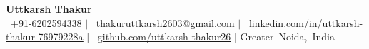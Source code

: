 \begin{center}
    \textbf{\Huge Uttkarsh Thakur} \\ \vspace{4pt}
    \small
    \mbox{\faPhone* \hspace{2pt} +91-6202594338} \hspace{1pt} $|$
    \hspace{1pt} \mbox{\faEnvelope \hspace{2pt} \href{mailto:thakuruttkarsh2603@gmail.com}{thakuruttkarsh2603@gmail.com}} \hspace{1pt} $|$
    \hspace{1pt} \mbox{\faLinkedin \hspace{2pt} \href{https://www.linkedin.com/in/uttkarsh-thakur-76979228a/}{\uline{linkedin.com/in/uttkarsh-thakur-76979228a}}} \hspace{1pt} $|$
    \hspace{1pt} \mbox{\faGithub \hspace{2pt} \href{https://github.com/uttkarsh-thakur26/}{\uline{github.com/uttkarsh-thakur26}}} \hspace{1pt} $|$
    \hspace{1pt} \mbox{Greater Noida, India}
    \\ \vspace{-3pt}
\end{center}
